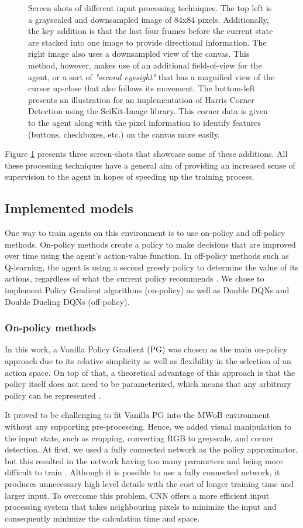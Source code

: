 \documentclass[10pt,journal,compsoc]{IEEEtran}
\begin{document}
\begin{figure}[h!]
	\caption{Screen shots of different input processing techniques. The top left is a grayscaled and downsampled image of 84x84 pixels. Additionally, the key addition is that the last four frames before the current state are stacked into one image to provide directional information. The right image also uses a downsampled view of the canvas. This method, however, makes use of an additional field-of-view for the agent, or a sort of \textit{"second eyesight"} that has a magnified view of the cursor up-close that also follows its movement. The bottom-left presents an illustration for an implementation of Harris Corner Detection using the SciKit-Image library. This corner data is given to the agent along with the pixel information to identify features (buttons, checkboxes, etc.) on the canvas more easily.}
	\label{fig:inputprocessing}
\end{figure}

Figure \ref{fig:inputprocessing} presents three screen-shots that showcase some of these additions.  All these processing techniques have a general aim of providing an increased sense of supervision to the agent in hopes of speeding up the training process.

\subsection{Implemented models}
One way to train agents on this environment is to use on-policy and off-policy methods. On-policy methods create a policy to make decisions that are improved over time using the agent's action-value function. In off-policy methods such as Q-learning, the agent is using a second greedy policy to determine the value of its actions, regardless of what the current policy recommends \cite{sutton1998reinforcement}. We chose to implement Policy Gradient algorithms (on-policy) as well as Double DQNs and Double Dueling DQNs (off-policy).
\subsubsection{On-policy methods}  
In this work, a Vanilla Policy Gradient (PG) was chosen as the main on-policy approach due to its relative simplicity as well as flexibility in the selection of an action space.
On top of that, a theoretical advantage of this approach is that the policy itself does not need to be parameterized, which means that any arbitrary policy can be represented \cite{Peters:2010}.

It proved to be challenging to fit Vanilla PG into the MWoB environment without any supporting pre-processing. Hence, we added visual manipulation to the input state, such as cropping, converting RGB to greyscale, and corner detection. At first, we used a fully connected network as the policy approximator, but this resulted in the network having too many parameters and being more difficult to train \cite{LongSD14}. Although it is possible to use a fully connected network, it produces unnecessary high level details with the cost of longer training time and larger input. To overcome this problem, CNN offers a more efficient input processing system that takes neighbouring pixels to minimize the input and consequently minimize the calculation time and space. 
\end{document}
